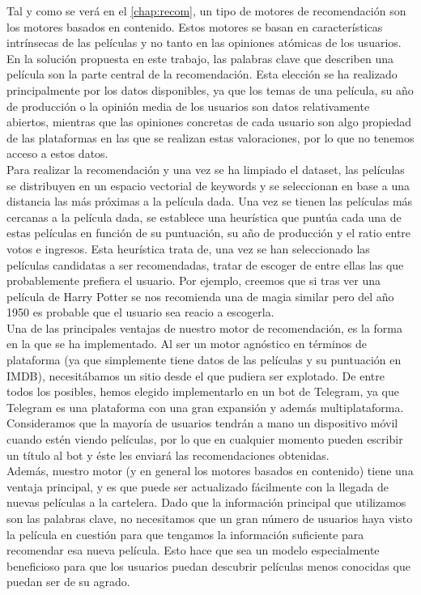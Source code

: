 Tal y como se verá en el \autoref{chap:recom}, un tipo de motores de recomendación son los motores basados en contenido. Estos motores se basan en características intrínsecas de las películas y no tanto en las opiniones atómicas de los usuarios. En la solución propuesta en este trabajo, las palabras clave que describen una película son la parte central de la recomendación. Esta elección se ha realizado principalmente por los datos disponibles, ya que los temas de una película, su año de producción o la opinión media de los usuarios son datos relativamente abiertos, mientras que las opiniones concretas de cada usuario son algo propiedad de las plataformas en las que se realizan estas valoraciones, por lo que no tenemos acceso a estos datos.\\ 

Para realizar la recomendación y una vez se ha limpiado el dataset, las películas se distribuyen en un espacio vectorial de keywords y se seleccionan en base a una distancia las más próximas a la película dada. Una vez se tienen las películas más cercanas a la película dada, se establece una heurística que puntúa cada una de estas películas en función de su puntuación, su año de producción y el ratio entre votos e ingresos. Esta heurística trata de, una vez se han seleccionado las películas candidatas a ser recomendadas, tratar de escoger de entre ellas las que probablemente prefiera el usuario. Por ejemplo, creemos que si tras ver una película de Harry Potter se nos recomienda una de magia similar pero del año 1950 es probable que el usuario sea reacio a escogerla.\\

Una de las principales ventajas de nuestro motor de recomendación, es la forma en la que se ha implementado. Al ser un motor agnóstico en términos de plataforma (ya que simplemente tiene datos de las películas y su puntuación en IMDB), necesitábamos un sitio desde el que pudiera ser explotado. De entre todos los posibles, hemos elegido implementarlo en un bot de Telegram, ya que Telegram es una plataforma con una gran expansión y además multiplataforma. Consideramos que la mayoría de usuarios tendrán a mano un dispositivo móvil cuando estén viendo películas, por lo que en cualquier momento pueden escribir un título al bot y éste les enviará las recomendaciones obtenidas.\\

Además, nuestro motor (y en general los motores basados en contenido) tiene una ventaja principal, y es que puede ser actualizado fácilmente con la llegada de nuevas películas a la cartelera. Dado que la información principal que utilizamos son las palabras clave, no necesitamos que un gran número de usuarios haya visto la película en cuestión para que tengamos la información suficiente para recomendar esa nueva película. Esto hace que sea un modelo especialmente beneficioso para que los usuarios puedan descubrir películas menos conocidas que puedan ser de su agrado.\\

